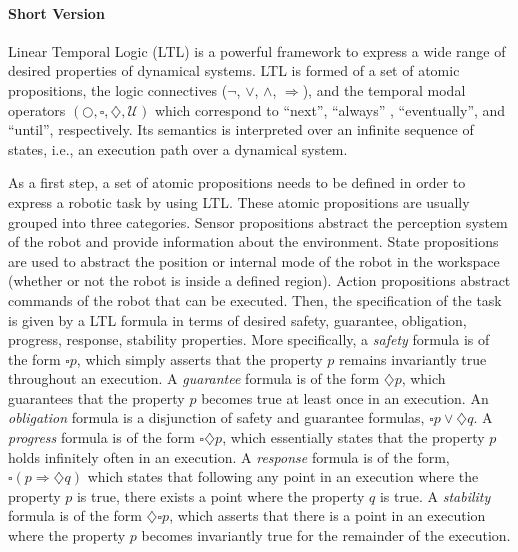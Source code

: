 \documentclass[10pt,letterpaper]{article}
\begin{document}
	

	





\paragraph{Short Version}

Linear Temporal Logic (LTL) is a powerful framework to express a wide range of desired properties of dynamical systems. LTL is formed of a set of atomic propositions, the logic connectives ($\neg$, $\lor$, $\land$, $\Rightarrow$), and the temporal modal operators $(\bigcirc, \square, \diamondsuit, \mathcal{U})$ which correspond to ``next'', ``always'' , ``eventually'', and ``until'', respectively. Its semantics is interpreted over an infinite sequence of states, i.e., an execution path over a dynamical system.



As a first step, a set of atomic propositions needs to be defined in order to express a robotic task by using LTL. These atomic propositions are usually grouped into three categories. Sensor propositions abstract the perception system of the robot and provide information about the environment. State propositions are used to abstract the position or internal mode of the robot in the workspace (whether or not the robot is inside a defined region). Action propositions abstract commands of the robot that can be executed. Then, the specification of the task is given by a LTL formula in terms of desired safety, guarantee, obligation, progress, response, stability properties. More specifically, a \textit{safety} formula is of the form $\square p$, which simply asserts that the property $p$ remains invariantly true throughout an execution. A \textit{guarantee} formula is of the form $\diamondsuit p$, which guarantees that the property $p$ becomes true at least once in an execution. An\textit{ obligation} formula is a disjunction of safety and guarantee formulas, $\square p \lor \diamondsuit q$. A \textit{progress} formula is of the form $\square \diamondsuit p$, which essentially states that the property $p$ holds infinitely often in an execution. A \textit{response} formula is of the form, $\square (p \Rightarrow \diamondsuit q)$ which states that following any point in an execution where the property $p$ is true, there exists a point where the property $q$ is true. A \textit{stability} formula is of the form $\diamondsuit \square p$, which asserts that there is a point in an execution where the property $p$ becomes invariantly true for the remainder of the execution. 
	
\end{document}
